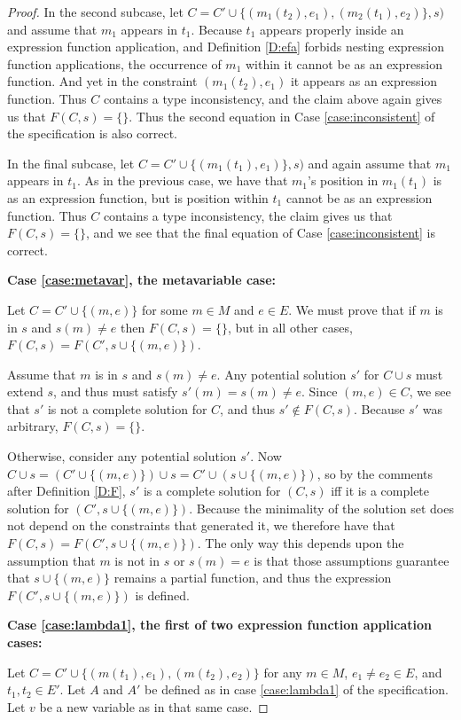 \documentclass{article}
\begin{document}
\begin{proof}
In the second subcase, let $C=C'\cup\{(m_1(t_2),e_1),(m_2(t_1),e_2)\},s)$ and assume that $m_1$ appears in $t_1$.  Because $t_1$ appears properly inside an expression function application, and Definition \ref{D:efa} forbids nesting expression function applications, the occurrence of $m_1$ within it cannot be as an expression function.  And yet in the constraint $(m_1(t_2),e_1)$ it appears as an expression function.  Thus $C$ contains a type inconsistency, and the claim above again gives us that $F(C,s)=\{\}$.  Thus the second equation in Case \ref{case:inconsistent} of the specification is also correct.

In the final subcase, let $C=C'\cup\{(m_1(t_1),e_1)\},s)$ and again assume that $m_1$ appears in $t_1$.  As in the previous case, we have that $m_1$'s position in $m_1(t_1)$ is as an expression function, but is position within $t_1$ cannot be as an expression function.  Thus $C$ contains a type inconsistency, the claim gives us that $F(C,s)=\{\}$, and we see that the final equation of Case \ref{case:inconsistent} is correct.

{\bf Case \ref{case:metavar}, the metavariable case:}

Let $C=C'\cup\{(m,e)\}$ for some $m\in M$ and $e\in E$.  We must prove that if $m$ is in $s$ and $s(m)\neq e$ then $F(C,s)=\{\}$, but in all other cases, $F(C,s)=F(C',s\cup\{(m,e)\})$.

Assume that $m$ is in $s$ and $s(m)\neq e$.  Any potential solution $s'$ for $C\cup s$ must extend $s$, and thus must satisfy $s'(m)=s(m)\neq e$.  Since $(m,e)\in C$, we see that $s'$ is not a complete solution for $C$, and thus $s'\notin F(C,s)$.  Because $s'$ was arbitrary, $F(C,s)=\{\}$.

Otherwise, consider any potential solution $s'$.  Now $C\cup s=(C'\cup \{(m,e)\})\cup s=C'\cup(s\cup\{(m,e)\})$, so by the comments after Definition \ref{D:F}, $s'$ is a complete solution for $(C,s)$ iff it is a complete solution for $(C',s\cup\{(m,e)\})$.  Because the minimality of the solution set does not depend on the constraints that generated it, we therefore have that $F(C,s)=F(C',s\cup\{(m,e)\})$.  The only way this depends upon the assumption that $m$ is not in $s$ or $s(m)=e$ is that those assumptions guarantee that $s\cup\{(m,e)\}$ remains a partial function, and thus the expression $F(C',s\cup\{(m,e)\})$ is defined.

{\bf Case \ref{case:lambda1}, the first of two expression function application cases:}

Let $C=C'\cup\{(m(t_1),e_1),(m(t_2),e_2)\}$ for any $m\in M$, $e_1\neq e_2\in E$, and $t_1,t_2\in E'$.  Let $A$ and $A'$ be defined as in case \ref{case:lambda1} of the specification.  Let $v$ be a new variable as in that same case.


\end{proof}
\end{document}
